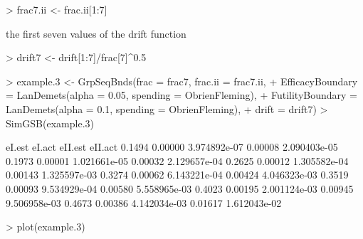 \documentclass{article}
\begin{document}
\begin{itemize}
{\begin{Schunk}
\begin{Sinput}
> frac7.ii <- frac.ii[1:7]
\end{Sinput}
\end{Schunk}

    the first seven values of the drift function

\begin{Schunk}
\begin{Sinput}
> drift7 <- drift[1:7]/frac[7]^0.5
\end{Sinput}
\end{Schunk}

\begin{Schunk}
\begin{Sinput}
> example.3 <- GrpSeqBnds(frac = frac7, frac.ii = frac7.ii, 
+     EfficacyBoundary = LanDemets(alpha = 0.05, spending = ObrienFleming), 
+     FutilityBoundary = LanDemets(alpha = 0.1, spending = ObrienFleming), 
+     drift = drift7)
> SimGSB(example.3)
\end{Sinput}
\begin{Soutput}
        eI.est       eI.act eII.est      eII.act
0.1494 0.00000 3.974892e-07 0.00008 2.090403e-05
0.1973 0.00001 1.021661e-05 0.00032 2.129657e-04
0.2625 0.00012 1.305582e-04 0.00143 1.325597e-03
0.3274 0.00062 6.143221e-04 0.00424 4.046323e-03
0.3519 0.00093 9.534929e-04 0.00580 5.558965e-03
0.4023 0.00195 2.001124e-03 0.00945 9.506958e-03
0.4673 0.00386 4.142034e-03 0.01617 1.612043e-02
\end{Soutput}
\end{Schunk}

\begin{Schunk}
\begin{Sinput}
> plot(example.3)
\end{Sinput}
\end{Schunk}
  }
  

\end{itemize}
\end{document}
